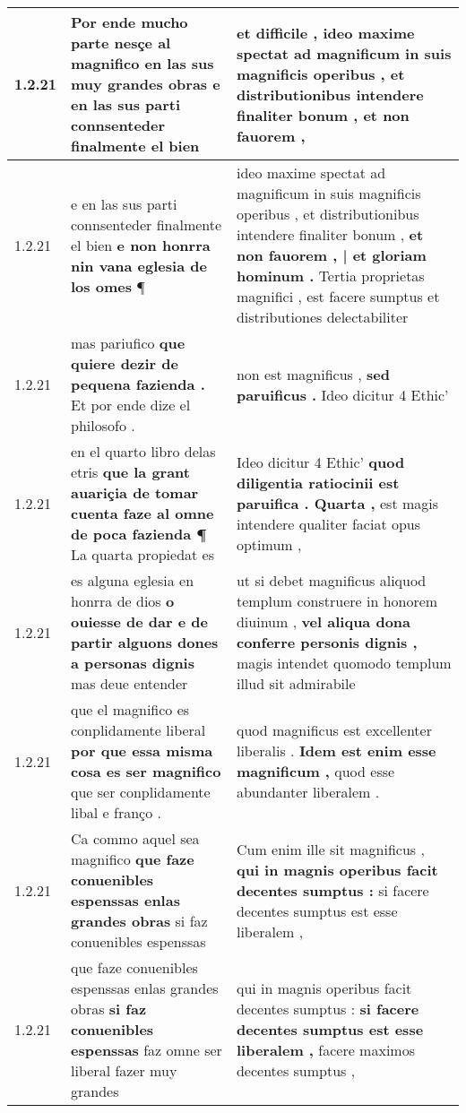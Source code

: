 \begin{tabular}{|p{1cm}|p{6.5cm}|p{6.5cm}|}
1.2.21 & Por ende mucho parte nesçe al magnifico \textbf{ en las sus muy grandes obras } e en las sus parti connsenteder finalmente el bien & et difficile , \textbf{ ideo maxime spectat ad magnificum in suis magnificis operibus , et distributionibus intendere finaliter bonum , } et non fauorem , \\\hline
1.2.21 & e en las sus parti connsenteder finalmente el bien \textbf{ e non honrra nin vana eglesia de los omes } ¶ & ideo maxime spectat ad magnificum in suis magnificis operibus , et distributionibus intendere finaliter bonum , \textbf{ et non fauorem , | et gloriam hominum . } Tertia proprietas magnifici , est facere sumptus et distributiones delectabiliter \\\hline
1.2.21 & mas pariufico \textbf{ que quiere dezir de pequena fazienda . } Et por ende dize el philosofo . & non est magnificus , \textbf{ sed paruificus . } Ideo dicitur 4 Ethic’ \\\hline
1.2.21 & en el quarto libro delas etris \textbf{ que la grant auariçia de tomar cuenta faze al omne de poca fazienda ¶ } La quarta propiedat es & Ideo dicitur 4 Ethic’ \textbf{ quod diligentia ratiocinii est paruifica . Quarta , } est magis intendere qualiter faciat opus optimum , \\\hline
1.2.21 & es alguna eglesia en honrra de dios \textbf{ o ouiesse de dar e de partir alguons dones a personas dignis } mas deue entender & ut si debet magnificus aliquod templum construere in honorem diuinum , \textbf{ vel aliqua dona conferre personis dignis , } magis intendet quomodo templum illud sit admirabile \\\hline
1.2.21 & que el magnifico es conplidamente liberal \textbf{ por que essa misma cosa es ser magnifico } que ser conplidamente libal e franço . & quod magnificus est excellenter liberalis . \textbf{ Idem est enim esse magnificum , } quod esse abundanter liberalem . \\\hline
1.2.21 & Ca commo aquel sea magnifico \textbf{ que faze conuenibles espenssas enlas grandes obras } si faz conuenibles espenssas & Cum enim ille sit magnificus , \textbf{ qui in magnis operibus facit decentes sumptus : } si facere decentes sumptus est esse liberalem , \\\hline
1.2.21 & que faze conuenibles espenssas enlas grandes obras \textbf{ si faz conuenibles espenssas } faz omne ser liberal fazer muy grandes & qui in magnis operibus facit decentes sumptus : \textbf{ si facere decentes sumptus est esse liberalem , } facere maximos decentes sumptus , \\\hline

\end{tabular}
